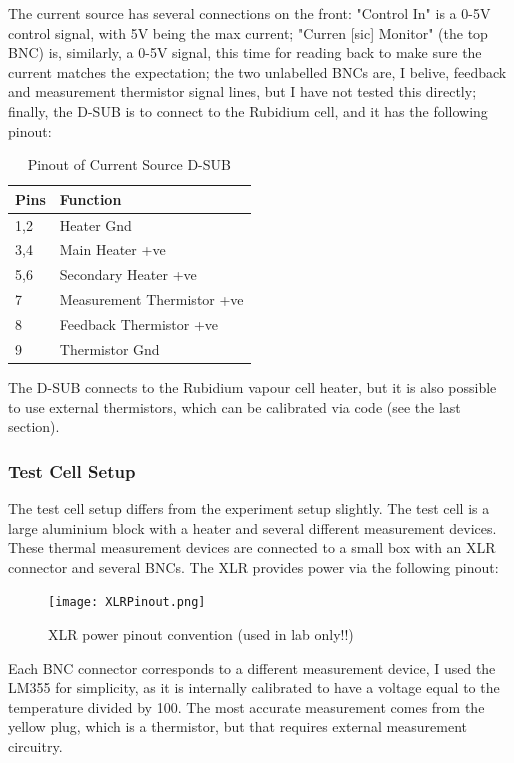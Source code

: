 \documentclass[11pt, letterpaper]{article}
\begin{document}
The current source has several connections on the front: "Control In" is a 0-5V control signal, with 5V being the max current; "Curren [sic] Monitor" (the top BNC) is, similarly, a 0-5V signal, this time for reading back to make sure the current matches the expectation; the two unlabelled BNCs are, I belive, feedback and measurement thermistor signal lines, but I have not tested this directly; finally, the D-SUB is to connect to the Rubidium cell, and it has the following pinout:

\begin{table}[H]
    \centering
    \begin{tabular}{ll}
        \toprule
        \textbf{Pins} & \textbf{Function} \\
        \midrule
        1,2 & Heater Gnd \\
        3,4 & Main Heater +ve \\
        5,6 & Secondary Heater +ve \\
        7 & Measurement Thermistor +ve \\
        8 & Feedback Thermistor +ve \\
        9 &  Thermistor Gnd \\
        \bottomrule
    \end{tabular}
    \caption{Pinout of Current Source D-SUB}
    \label{tab:sourcePinout}
\end{table}

The D-SUB connects to the Rubidium vapour cell heater, but it is also possible to use external thermistors, which can be calibrated via code (see the last section).

\subsubsection{Test Cell Setup}

The test cell setup differs from the experiment setup slightly. The test cell is a large aluminium block with a heater and several different measurement devices. These thermal measurement devices are connected to a small box with an XLR connector and several BNCs. The XLR provides power via the following pinout:

\begin{figure}[H]
    \centering
    \texttt{[image: XLRPinout.png]}
    \caption{ XLR power pinout convention (used in lab only!!) }
    \label{fig:XLRPinout}
\end{figure}

Each BNC connector corresponds to a different measurement device, I used the LM355 for simplicity, as it is internally calibrated to have a voltage equal to the temperature divided by 100. The most accurate measurement comes from the yellow plug, which is a thermistor, but that requires external measurement circuitry.
\end{document}
